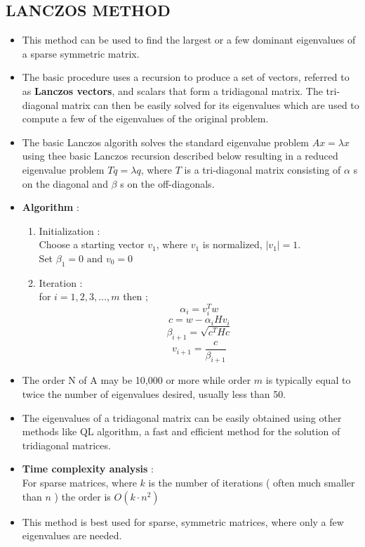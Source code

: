 \documentclass[report,12pt,onecolumn]{IEEEtran}
\theoremstyle{remark}
\begin{document}
\begin{itemize}
		\section{LANCZOS METHOD}
		\begin{itemize}
			\item This method can be used to find the largest or a few dominant eigenvalues of a sparse symmetric matrix.
			\item The basic procedure uses a recursion to produce a set of vectors, referred to as \textbf{Lanczos vectors}, and scalars that form a tridiagonal matrix. The tri-diagonal matrix can then be easily solved for its eigenvalues which are used to compute a few of the eigenvalues of the original problem.
			\item The basic Lanczos algorith solves the standard eigenvalue problem $Ax = \lambda x$ using thee basic Lanczos recursion described below resulting in a reduced eigenvalue problem $Tq = \lambda q$, where $T$ is a tri-diagonal matrix consisting of $\alpha$ s on the diagonal and $\beta$ s on the off-diagonals.
			\item \textbf{Algorithm} :
				\begin{enumerate}
					\item Initialization : \\
						Choose a starting vector $v_1$, where $v_1$ is normalized, $|v_1| = 1$. \\
						Set $\beta_{1} = 0 \text{ and } v_0 = 0$
					\item Iteration : \\
						for $i=1,2,3,\dots,m$ then ; \\
						$$ \alpha_{i} = v_{i}^T w $$
						$$ c = w - \alpha_{i} H v_{i} $$
						$$ \beta_{i+1} = \sqrt{c^T H c} $$
						$$ v_{i+1} = \frac{c}{\beta_{i+1}} $$
				\end{enumerate}
			\item The order N of A may be 10,000 or more while order $m$ is typically equal to twice the number of eigenvalues desired, usually less than 50.
			\item The eigenvalues of a tridiagonal matrix can be easily obtained using other methods like QL algorithm, a fast and efficient method for the solution of tridiagonal matrices.

				
			\item \textbf{Time complexity analysis} : \\
				For sparse matrices, where $k$ is the number of iterations ( often much smaller than $n$ ) the order is $O(k \cdot n^2)$
			\item This method is best used for sparse, symmetric matrices, where only a few eigenvalues are needed.
		\end{itemize}

\end{itemize}
\end{document}

